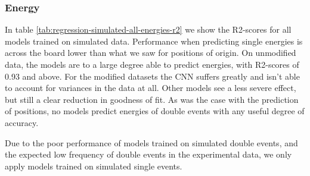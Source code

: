 \subsubsection{Energy}
In table \ref{tab:regression-simulated-all-energies-r2} we show the R2-scores for all
models trained on simulated data.
Performance when predicting single energies is across the board lower than what we saw
for positions of origin. On unmodified data, the models are to a large degree able to
predict energies, with R2-scores of 0.93 and above. For the modified datasets the CNN
suffers greatly and isn't able to account for variances in the data at all. Other models
see a less severe effect, but still a clear reduction in goodness of fit.
As was the case with the prediction of positions, no models predict energies
of double events with any useful degree of accuracy.


Due to the poor performance of models trained on simulated double events, and the
expected low frequency of double events in the experimental data, we only apply models
trained on simulated single events.

